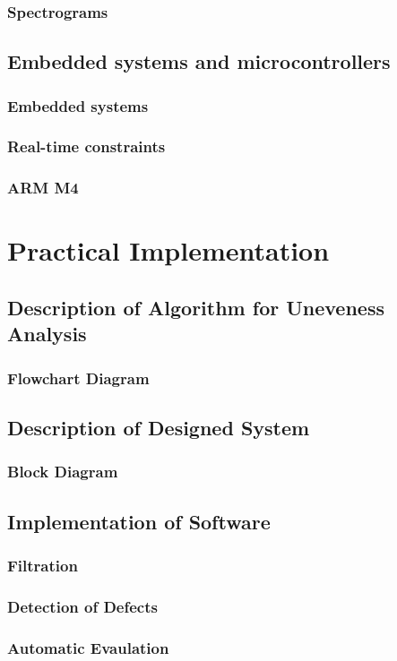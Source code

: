 \documentclass[twoside]{ctuthesis}
\theoremstyle{plain}
\theoremstyle{definition}
\theoremstyle{note}
\begin{document}
\subsection{Spectrograms}
\section{Embedded systems and microcontrollers}
\subsection{Embedded systems}
\subsection{Real-time constraints}
\subsection{ARM M4}

\chapter{Practical Implementation}
\section{Description of Algorithm for Uneveness Analysis}
\subsection{Flowchart Diagram}
\section{Description of Designed System}
\subsection{Block Diagram}
\section{Implementation of Software}
\subsection{Filtration}
\subsection{Detection of Defects}
\subsection{Automatic Evaulation}
\end{document}
